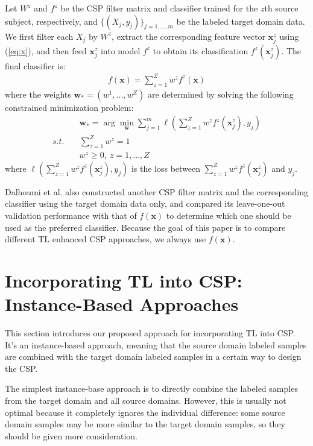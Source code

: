 \documentclass[runningheads]{llncs}
\begin{document}
Let $W^z$ and $f^z$ be the CSP filter matrix and classifier trained for the $z$th source subject, respectively, and $\{(X_j, y_j)\}_{j=1,...,m}$ be the labeled target domain data. We first filter each $X_j$ by $W^z$, extract the corresponding feature vector $\mathbf{x}_j^z$ using (\ref{eq:x}), and then feed $\mathbf{x}_j^z$ into model $f^z$ to obtain its classification $f^z(\mathbf{x}_j^z)$. The final classifier is:
\begin{align}
f(\mathbf{x})=\sum_{z=1}^Z w^zf^z(\mathbf{x}) \label{14}
\end{align}
where the weights $\mathbf{w}_*=(w^1,...,w^Z)$ are determined by solving the following constrained minimization problem:
\begin{align}
&\mathbf{w}_*=\arg\min_{\mathbf{w}}\sum_{j=1}^m\ell\left(\sum_{z=1}^Zw^zf^z(\mathbf{x}_j^z),y_j\right)\\
s.t. \quad & \sum_{z=1}^Zw^z=1 \nonumber\\
&w^z\ge 0, \ z=1,...,Z \nonumber
\end{align}
where $\ell\left(\sum_{z=1}^Zw^zf^z(\mathbf{x}_j^z),y_j\right)$ is the loss between $\sum_{z=1}^Zw^zf^z(\mathbf{x}_j^z)$ and $y_j$.

Dalhoumi et al. \cite{Dalhoumi2014} also constructed another CSP filter matrix and the corresponding classifier using the target domain data only, and compared its leave-one-out validation performance with that of $f(\mathbf{x})$ to determine which one should be used as the preferred classifier. Because the goal of this paper is to compare different TL enhanced CSP approaches, we always use $f(\mathbf{x})$.

\section{Incorporating TL into CSP: Instance-Based Approaches} \label{sect:TLCSP}

This section introduces our proposed approach for incorporating TL into CSP. It's an instance-based approach, meaning that the source domain labeled samples are combined with the target domain labeled samples in a certain way to design the CSP.

The simplest instance-base approach is to directly combine the labeled samples from the target domain and all source domains. However, this is usually not optimal because it completely ignores the individual difference: some source domain samples may be more similar to the target domain samples, so they should be given more consideration.
\end{document}
